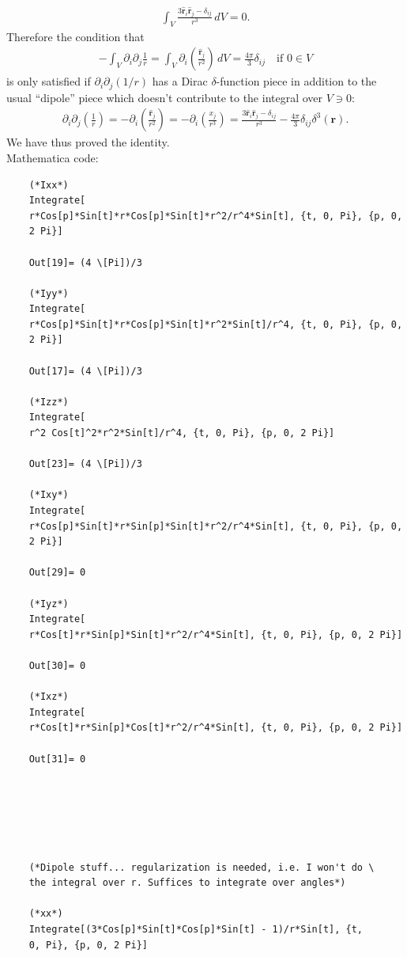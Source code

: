 \documentclass{article}
\theoremstyle{definition}
\newcommand{\p}{\partial}
\newcommand{\f}[2]{\frac{#1}{#2}}
\newcommand{\lp}{\left(}
\newcommand{\rp}{\right)}
\begin{document}
\begin{enumerate}[label=(\alph*)]
	\begin{align*}
	\int_V \f{3 \hat{\bm{r}}_i \hat{\bm{r}}_j - \delta_{ij}}{r^3}\,dV = 0.
	\end{align*}
	Therefore the condition that 
	\begin{align*}
	-\int_V \p_i \p_j \f{1}{r} = \int_V  \p_i \lp \f{\hat{\bm{r}}_j}{r^2}\rp\,dV = \f{4\pi}{3}\delta_{ij} \quad \text{if } {0 \in V} 
	\end{align*}
	is only satisfied if $\p_i \p_j (1/r)$ has a Dirac $\delta$-function piece in addition to the usual ``dipole'' piece which doesn't contribute to the integral over $V \ni 0$:
	\begin{align*}
	\p_i \p_j \lp \f{1}{r} \rp = -\p_i \lp \f{\hat{\bm{r}}_j}{r^2} \rp = -\p_i \lp \f{x_j}{r^3} \rp = \f{3 \hat{\bm{r}}_i \hat{\bm{r}}_j - \delta_{ij}}{r^3} - \f{4\pi}{3} \delta_{ij} \delta^3(\bm{r}).
	\end{align*}
	We have thus proved the identity. \\
	
	
	
	Mathematica code:
	\begin{lstlisting}
	(*Ixx*)
	Integrate[
	r*Cos[p]*Sin[t]*r*Cos[p]*Sin[t]*r^2/r^4*Sin[t], {t, 0, Pi}, {p, 0, 
	2 Pi}]
	
	Out[19]= (4 \[Pi])/3
	
	(*Iyy*)
	Integrate[
	r*Cos[p]*Sin[t]*r*Cos[p]*Sin[t]*r^2*Sin[t]/r^4, {t, 0, Pi}, {p, 0, 
	2 Pi}]
	
	Out[17]= (4 \[Pi])/3
	
	(*Izz*)
	Integrate[
	r^2 Cos[t]^2*r^2*Sin[t]/r^4, {t, 0, Pi}, {p, 0, 2 Pi}]
	
	Out[23]= (4 \[Pi])/3
	
	(*Ixy*)
	Integrate[
	r*Cos[p]*Sin[t]*r*Sin[p]*Sin[t]*r^2/r^4*Sin[t], {t, 0, Pi}, {p, 0, 
	2 Pi}]
	
	Out[29]= 0
	
	(*Iyz*)
	Integrate[
	r*Cos[t]*r*Sin[p]*Sin[t]*r^2/r^4*Sin[t], {t, 0, Pi}, {p, 0, 2 Pi}]
	
	Out[30]= 0
	
	(*Ixz*)
	Integrate[
	r*Cos[t]*r*Sin[p]*Cos[t]*r^2/r^4*Sin[t], {t, 0, Pi}, {p, 0, 2 Pi}]
	
	Out[31]= 0
	
	
	
	
	
	
	(*Dipole stuff... regularization is needed, i.e. I won't do \
	the integral over r. Suffices to integrate over angles*)
	
	(*xx*)
	Integrate[(3*Cos[p]*Sin[t]*Cos[p]*Sin[t] - 1)/r*Sin[t], {t, 
	0, Pi}, {p, 0, 2 Pi}]
	

\end{lstlisting}
\end{enumerate}
\end{document}
